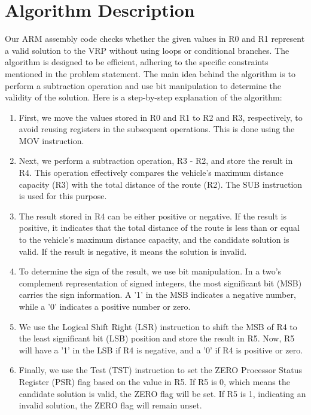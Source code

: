 \section{Algorithm Description}

Our ARM assembly code checks whether the given values in R0 and R1 represent a valid solution to the VRP without using loops or conditional branches. The algorithm is designed to be efficient, adhering to the specific constraints mentioned in the problem statement. The main idea behind the algorithm is to perform a subtraction operation and use bit manipulation to determine the validity of the solution. Here is a step-by-step explanation of the algorithm:

\begin{enumerate}
  \item First, we move the values stored in R0 and R1 to R2 and R3, respectively, to avoid reusing registers in the subsequent operations. This is done using the MOV instruction.
  \item Next, we perform a subtraction operation, R3 - R2, and store the result in R4. This operation effectively compares the vehicle's maximum distance capacity (R3) with the total distance of the route (R2). The SUB instruction is used for this purpose.
  \item The result stored in R4 can be either positive or negative. If the result is positive, it indicates that the total distance of the route is less than or equal to the vehicle's maximum distance capacity, and the candidate solution is valid. If the result is negative, it means the solution is invalid.
  \item To determine the sign of the result, we use bit manipulation. In a two's complement representation of signed integers, the most significant bit (MSB) carries the sign information. A '1' in the MSB indicates a negative number, while a '0' indicates a positive number or zero.
  \item We use the Logical Shift Right (LSR) instruction to shift the MSB of R4 to the least significant bit (LSB) position and store the result in R5. Now, R5 will have a '1' in the LSB if R4 is negative, and a '0' if R4 is positive or zero.
  \item Finally, we use the Test (TST) instruction to set the ZERO Processor Status Register (PSR) flag based on the value in R5. If R5 is 0, which means the candidate solution is valid, the ZERO flag will be set. If R5 is 1, indicating an invalid solution, the ZERO flag will remain unset.
\end{enumerate}

